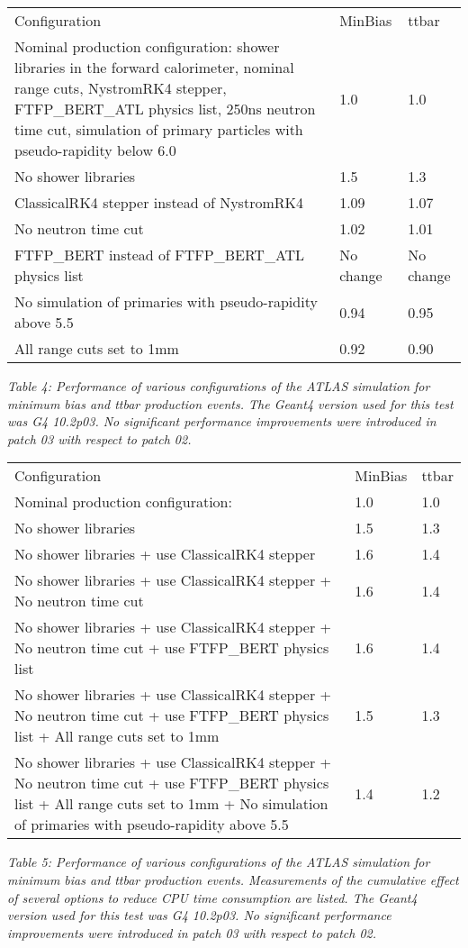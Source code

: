 \documentclass[12pt,a4paper]{article}
\begin{document}
\begin{longtable}[]{@{}lll@{}}
\toprule
\endhead
Configuration & MinBias & ttbar\tabularnewline
Nominal production configuration: shower libraries in the forward
calorimeter, nominal range cuts, NystromRK4 stepper, FTFP\_BERT\_ATL
physics list, 250ns neutron time cut, simulation of primary particles
with pseudo-rapidity below 6.0 & 1.0 & 1.0\tabularnewline
No shower libraries & 1.5 & 1.3\tabularnewline
ClassicalRK4 stepper instead of NystromRK4 & 1.09 & 1.07\tabularnewline
No neutron time cut & 1.02 & 1.01\tabularnewline
FTFP\_BERT instead of FTFP\_BERT\_ATL physics list & No change & No
change\tabularnewline
No simulation of primaries with pseudo-rapidity above 5.5 & 0.94 &
0.95\tabularnewline
All range cuts set to 1mm & 0.92 & 0.90\tabularnewline
\bottomrule
\end{longtable}

\emph{Table 4: Performance of various configurations of the ATLAS
simulation for minimum bias and ttbar production events. The Geant4
version used for this test was G4 10.2p03. No significant performance
improvements were introduced in patch 03 with respect to patch 02.}

\begin{longtable}[]{@{}lll@{}}
\toprule
\endhead
Configuration & MinBias & ttbar\tabularnewline
Nominal production configuration: & 1.0 & 1.0\tabularnewline
No shower libraries & 1.5 & 1.3\tabularnewline
No shower libraries + use ClassicalRK4 stepper & 1.6 &
1.4\tabularnewline
No shower libraries + use ClassicalRK4 stepper + No neutron time cut &
1.6 & 1.4\tabularnewline
No shower libraries + use ClassicalRK4 stepper + No neutron time cut +
use FTFP\_BERT physics list & 1.6 & 1.4\tabularnewline
No shower libraries + use ClassicalRK4 stepper + No neutron time cut +
use FTFP\_BERT physics list + All range cuts set to 1mm & 1.5 &
1.3\tabularnewline
No shower libraries + use ClassicalRK4 stepper + No neutron time cut +
use FTFP\_BERT physics list + All range cuts set to 1mm + No simulation
of primaries with pseudo-rapidity above 5.5 & 1.4 & 1.2\tabularnewline
\bottomrule
\end{longtable}

\emph{Table 5: Performance of various configurations of the ATLAS
simulation for minimum bias and ttbar production events. Measurements of
the cumulative effect of several options to reduce CPU time consumption
are listed. The Geant4 version used for this test was G4 10.2p03. No
significant performance improvements were introduced in patch 03 with
respect to patch 02.}
\end{document}
